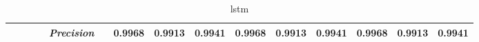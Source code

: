 \begin{table}[]
\begin{tabularx}{\textwidth}{XXlllllllllllll@{}}
                                                                    &                                                                     &                                                           &    & \textit{Precision} &                                                      & 0.9968 & 0.9913 & 0.9941 & 0.9968 & 0.9913 & 0.9941 & 0.9968 & 0.9913 & 0.9941 \\ \midrule
\end{tabularx}
\caption{lstm}
\label{tab:all_results_lstm}
\end{table}